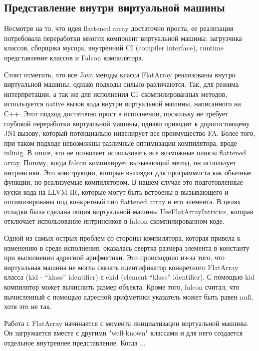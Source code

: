 \subsection{Представление внутри виртуальной машины}
Несмотря на то, что идея flattened array достаточно проста, ее реализация потребовала переработки многих компонент виртуальной машины: загрузчика классов, сборщика мусора, внутренний CI (compiler interface), runtime представление классов и Falcon компилятора.
\par 
Стоит отметить, что все Java методы класса FlatArray реализованы внутри виртуальной машины, однако подходы сильно различаются. Так, для режима интерпретации, а так же для исполнения С1 скомпилированных методов, используется native вызов кода внутри виртуальной машины, написанного на С++. Этот подход достаточно прост в исполнении, поскольку не требует глубокой переработки виртуальной машины, однако приводит к дорогостоящему JNI вызову, который потенциально нивелирует все преимущество FA. Более того, при таком подходе невозможны различные оптимизации компилятора, вроде inlinig.
В итоге, это не позволяет использовать все возможные плюсы flattened array. Потому, когда falcon компилирует вызывающий метод, он использует интринсики. Это конструкции, которые выглядят для программиста как обычные функции, но реализуемые компилятором. В нашем случае это подготовленные куски кода на LLVM IR, которые могут быть встроены в вызывающего и оптимизированы под конкретный тип flattened array и его элемента.
В целях отладки была сделана опция виртуальной машины UseFlatArrayIntricics, которая отключает использование интринсиков в falcon скомпилированном коде.   
\par
Одной из самых острых проблем со стороны компилятора, которая привела к изменению в среде исполнения, оказалась свертка размера элемента в константу при выполнении адресной арифметики. Это происходило из-за того, что виртуальная машина не могла связать идентификатор конкретного FlatArray класса (kid - “klass” identifier) с ekid (element “klass” identifier). С помощью kid компилятор может вычислить размер объекта. Кроме того, falcon считал, что вычисленный с помощью адресной арифметики указатель может быть равен null, хотя это не так. 
\par 
Работа с FlatArray начинается с момента инициализации виртуальной машины. Он загружается вместе с другими "well-known" классами и для него создается отдельное внутреннее представление. Когда ...

